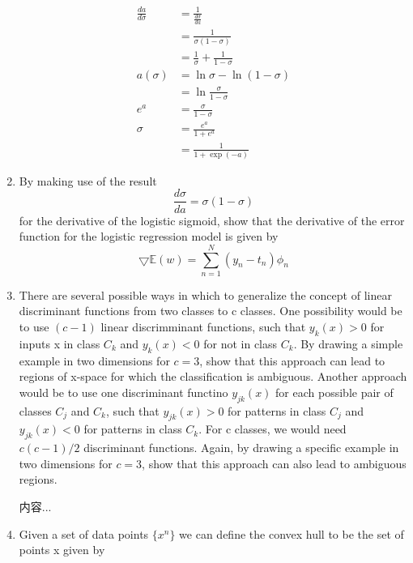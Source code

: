 \documentclass[a4paper]{article}
\begin{document}
\begin{enumerate}
\begin{solution}
\begin{equation*}
			\begin{aligned}
				\frac{da}{d\sigma}&=\frac{1}{\frac{d\sigma}{da}}\\
				&=\frac{1}{\sigma(1-\sigma)}\\
				&=\frac{1}{\sigma}+\frac{1}{1-\sigma}\\
				a(\sigma)&=\ln \sigma - \ln (1-\sigma)\\
				&=\ln \frac{\sigma}{1-\sigma}\\
				e^a&=\frac{\sigma}{1-\sigma}\\
				\sigma&=\frac{e^a}{1+e^a}\\
				&=\frac{1}{1+\exp (-a)}
			\end{aligned}
			\end{equation*}
		\end{solution}
		\item
		By making use of the result
		\begin{equation*}
			\frac{d\sigma}{da}=\sigma(1-\sigma)
		\end{equation*}
		for the derivative of the logistic sigmoid, show that the derivative of the error function for the logistic regression model is given by
		\begin{equation*}
			\bigtriangledown \mathbb{E}(w)=\sum_{n=1}^{N}(y_n-t_n)\phi_n
		\end{equation*}
		\item
		There are several possible ways in which to generalize the concept of linear discriminant functions from two classes to c classes. One possibility would be to use $(c-1)$ linear discrimminant functions, such that $y_k(x)>0$ for inputs x in class $C_k$ and $y_k(x) < 0$ for not in class $C_k$. By drawing a simple example in two dimensions for $c=3$, show that this approach can lead to regions of x-space for which the classification is ambiguous. Another approach would be to use one discriminant functino $y_{jk}(x)$ for each possible pair of classes $C_j$ and $C_k$, such that $y_{jk}(x) >0$ for patterns in class $C_j$ and $y_{jk}(x) <0$ for patterns in class $C_k$. For c classes, we would need $c(c-1)/2$ discriminant functions. Again, by drawing a specific example in two dimensions for $c=3$, show that this approach can also lead to ambiguous regions.
		\begin{solution}
			内容...
		\end{solution}
		\item
		Given a set of data points $\{x^n\}$ we can define the convex hull to be the set of points x given by
		\begin{equation*}

\end{equation*}
\end{enumerate}
\end{document}
